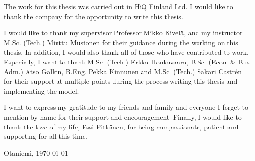 \documentclass[english, 12pt, a4paper, sci, utf8, a-2b, online, obeyspaces]{aaltothesis}
\begin{document}
The work for this thesis was carried out in HiQ Finland Ltd. I would like to thank the company for the opportunity to write this thesis. 

I would like to thank my supervisor Professor Mikko Kivelä, and my instructor M.Sc. (Tech.) Minttu Mustonen for their guidance during the working on this thesis. In addition, I would also thank all of those who have contributed to work. Especially, I want to thank M.Sc. (Tech.) Erkka Honkavaara, B.Sc. (Econ. \& Bus. Adm.) Atso Galkin, B.Eng. Pekka Kinnunen and M.Sc. (Tech.) Sakari Castrén for their support at multiple points during the process writing this thesis and implementing the model.

I want to express my gratitude to my friends and family and everyone I forget to mention by name for their support and encouragement. Finally, I would like to thank the love of my life, Essi Pitkänen, for being compassionate, patient and supporting for all this time.

\vspace{5cm}
Otaniemi, \today
\end{document}
